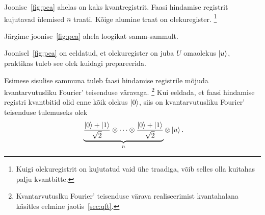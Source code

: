 \documentclass[12pt]{report}
\def\ket#1{\mathinner{|#1\rangle}}
\newcommand{\comment}[1]{}
\begin{document}
\comment{
\begin{figure}[h]
    \centering
    \begin{tikzpicture}
        \begin{yquant}
            qubit {$\ket0$} pea[1];
            qubit {$\ket0$} pea[+1];
            qubit {$\vdots$} pea[+1]; discard pea[2];
            qubit {$\ket0$} pea[+1];
            qubit {$\ket0$} pea[+1];

            qubit {$\ket u$} state;

            box {$\mathop{\rm QFT}$} (pea[0], pea[1], pea[2], pea[3], pea[4]);

            box {$U^{2^0}$} state | pea[4];
            box {$U^{2^1}$} state | pea[3];
            text {$\ \ldots\ $} pea[0], pea[1], pea[3], pea[4], state;
            box {$U^{2^{n-2}}$} state | pea[1];
            box {$U^{2^{n-1}}$} state | pea[0];

            box {$\mathop{\rm QFT}\nolimits^{-1}$} (pea[0], pea[1], pea[2], pea[3], pea[4]);
            measure pea[0], pea[1], pea[3], pea[4];
            output {$\phi_1$} pea[0];
            output {$\phi_2$} pea[1];
            output {$\vdots$} pea[2];
            output {$\phi_{n-1}$} pea[3];
            output {$\phi_n$} pea[4];
            output {$\ket u$} state;
        \end{yquant}
        \end{tikzpicture}
    \caption{Kvantahel \(U\) faasi hindamiseks \cite{nielnse+chuang, kaye+laflamme+mosca}}
    \label{fig:pea}
\end{figure}
}

Joonise~\ref{fig:pea} ahelas on kaks kvantregistrit.
Faasi hindamise registrit kujutavad ülemised \(n\) traati.
Kõige alumine traat on olekuregister.%
\footnote{Kuigi olekuregistrit on kujutatud vaid ühe traadiga, võib selles olla kuitahas palju kvantbitte.}

Järgime joonise~\ref{fig:pea} ahela loogikat samm-sammult.

Joonisel~\ref{fig:pea} on eeldatud, et olekuregister on juba \(U\) omaolekus
\(\ket{u}\), praktikas tuleb see olek kuidagi prepareerida.

Esimese sisulise sammuna tuleb faasi hindamise registrile mõjuda kvantarvutusliku Fourier' teisenduse väravaga.%
\footnote{Kvantarvutuslku Fourier' teisenduse värava realiseerimist kvantahalana käsitles eelmine jaotis~\ref{sec:qft}.}
Kui eeldada, et faasi hindamise registri kvantbitid olid enne kõik olekus \(\ket{0}\), siis on kvantarvutusliku Fourier' teisenduse tulemuseks olek
\begin{align}\label{f:peainit}
    \underbrace{\frac{\ket{0}+\ket{1}}{\sqrt{2}}
    \otimes \cdots
    \otimes \frac{\ket{0}+\ket{1}}{\sqrt{2}}}_n
    \otimes \ket{u} \rlap{.}
\end{align}
\end{document}
